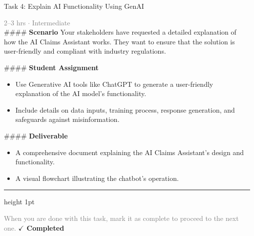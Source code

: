 \documentclass[10pt,a4paper]{article}
\begin{document}
\begin{taskbox}{Task 4: Explain AI Functionality Using GenAI}

    {\small \textcolor{gray}{2--3 hrs $\cdot$ Intermediate}}\\[12pt]

    \#\#\#\# \textbf{Scenario}  
Your stakeholders have requested a detailed explanation of how the AI Claims Assistant works. They want to ensure that the solution is user-friendly and compliant with industry regulations.  

\#\#\#\# \textbf{Student Assignment}  
\begin{itemize}
    \item Use Generative AI tools like ChatGPT to generate a user-friendly explanation of the AI model’s functionality.  
    \item Include details on data inputs, training process, response generation, and safeguards against misinformation.  
\end{itemize}

\#\#\#\# \textbf{Deliverable}  
\begin{itemize}
    \item A comprehensive document explaining the AI Claims Assistant's design and functionality.  
    \item A visual flowchart illustrating the chatbot’s operation.\par
\end{itemize}

    \vspace{16pt}

    \textcolor{cardBorder}{\hrule height 1pt}\vspace{8pt}

    \small \textcolor{gray}{When you are done with this task, mark it as complete to proceed to the next one.} \hfill \textbf{\textcolor{brandDark}{$\checkmark$ Completed}}

\end{taskbox}
\end{document}
